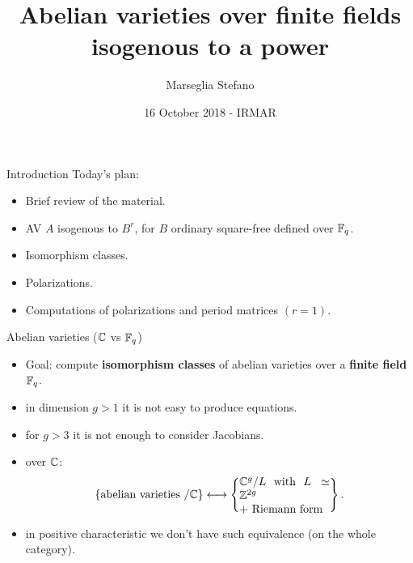\documentclass[usenames,dvipsnames,handout]{beamer}
\title[]{Abelian varieties over finite fields isogenous to a power}
\author[Marseglia Stefano]{Marseglia Stefano}
\institute[]{MPI/Stockholms University}
\date{16 October  2018 - IRMAR}
\begin{document}
\begin{frame}
\titlepage
\end{frame}

\begin{frame}{ Introduction }
Today's plan:
\begin{itemize}
 \item Brief review of the material.
 \item AV $A$ isogenous to $B^r$, for $B$ ordinary square-free defined over $\mathbb{F}_q$.
 \item Isomorphism classes.
 \item Polarizations.
 \item Computations of polarizations and period matrices $(r=1)$.
\end{itemize}
\end{frame}

\begin{frame}{ Abelian varieties ($\mathbb{C}$ vs $ \mathbb{F}_q $) }
\begin{itemize}
 \item Goal: compute \textbf{isomorphism classes} of abelian varieties over a \textbf{finite field} $\mathbb{F}_q$.
 \pause \item in dimension $g>1$ it is not easy to produce equations.
 \pause \item for $g>3$ it is not enough to consider Jacobians.
 \pause \item over $\mathbb{C}$:
 \[
      \set{ \text{abelian varieties $/\C$} } \longleftrightarrow 
      \set{\parbox[c]{8em}{$\C^g/L$ with $L\simeq \Z^{2g}$\\ $+$ Riemann form}}.
 \]
 \pause \vspace{-6mm} \item in positive characteristic we don't have such equivalence (on the whole category).
\end{itemize}
\end{frame}
\end{document}
